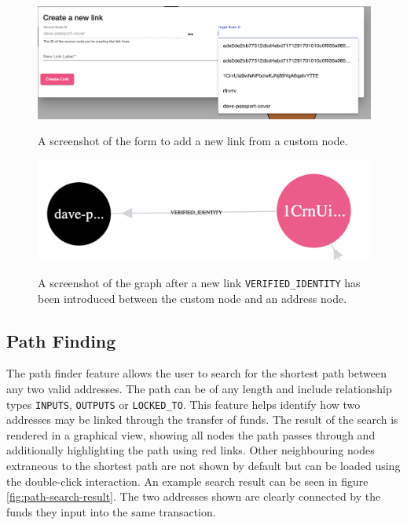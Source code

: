 \begin{figure}[h!]
  \centering
  \includegraphics[width = 15cm]{./figures/ui-screenshots/add-link-form}\\[0.5cm] 
  \caption{A screenshot of the form to add a new link from a custom node.}
  \label{fig:add-link-form}
\end{figure}

\begin{figure}[h!]
  \centering
  \includegraphics[width = 15cm]{./figures/ui-screenshots/custom-link-graph}\\[0.5cm] 
  \caption{A screenshot of the graph after a new link \texttt{VERIFIED\_IDENTITY} has been introduced between the custom node and an address node.}
  \label{fig:custom-link-graph}
\end{figure}

\subsection{Path Finding}
The path finder feature allows the user to search for the shortest path between any two valid addresses. The path can be of any length and include relationship types \texttt{INPUTS}, \texttt{OUTPUTS} or \texttt{LOCKED\_TO}. This feature helps identify how two addresses may be linked through the transfer of funds. The result of the search is rendered in a graphical view, showing all nodes the path passes through and additionally highlighting the path using red links. Other neighbouring nodes extraneous to the shortest path are not shown by default but can be loaded using the double-click interaction. An example search result can be seen in figure \ref{fig:path-search-result}. The two addresses shown are clearly connected by the funds they input into the same transaction. 

